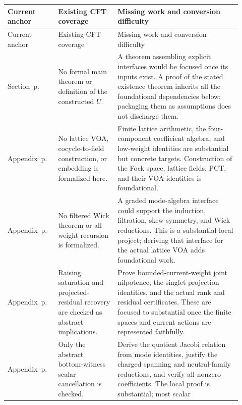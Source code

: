 \begin{longtable}{@{}P{0.15\linewidth}P{0.25\linewidth}P{0.52\linewidth}@{}}
\toprule
Current anchor & Existing CFT coverage & Missing work and conversion difficulty\\
\midrule\endfirsthead
\toprule
Current anchor & Existing CFT coverage & Missing work and conversion difficulty\\
\midrule\endhead
\bottomrule\endfoot
Section~\newline p.~
& No formal main theorem or definition of the constructed $U$.
& A theorem assembling explicit interfaces would be focused once its
inputs exist. A proof of the stated existence theorem inherits all
the foundational dependencies below; packaging them as assumptions
does not discharge them.\\
Appendix~\newline p.~
& No lattice VOA, cocycle-to-field construction, or embedding is
formalized here.
& Finite lattice arithmetic, the four-component coefficient algebra,
and low-weight identities are substantial but concrete targets.
Construction of the Fock space, lattice fields, PCT, and their VOA
identities is foundational.\\
Appendix~\newline p.~
& No filtered Wick theorem or all-weight recursion is formalized.
& A graded mode-algebra interface could support the induction,
filtration, skew-symmetry, and Wick reductions. This is a substantial
local project; deriving that interface for the actual lattice VOA
adds foundational work.\\
Appendix~\newline p.~
& Raising saturation and projected-residual recovery are checked as
abstract implications.
& Prove bounded-current-weight joint nilpotence, the singlet
projection identities, and the actual rank and residual certificates.
These are focused to substantial once the finite spaces and current
actions are represented faithfully.\\
Appendix~\newline p.~
& Only the abstract bottom-witness scalar cancellation is checked.
& Derive the quotient Jacobi relation from mode identities, justify
the charged spanning and neutral-family reductions, and verify all
nonzero coefficients. The local proof is substantial; most scalar

\end{longtable}
